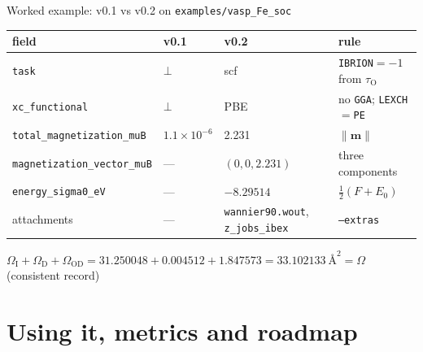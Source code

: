 \documentclass[aspectratio=169,10pt,t]{beamer}
\newcommand{\code}[1]{\texttt{#1}}
\newcommand{\vtag}[1]{\texttt{#1}}
\newcommand{\muted}[1]{\textcolor{muted}{#1}}
\begin{document}
\begin{frame}{Worked example: v0.1 vs v0.2 on \code{examples/vasp\_Fe\_soc}}
\centering\small
\begin{tabular}{@{}llll@{}}
\toprule
field & v0.1 & v0.2 & rule \\\midrule
\code{task} & \textcolor{bad}{\(\bot\)} & \textcolor{good}{scf} & \vtag{IBRION}\(=-1\) from \(\tau_{\mathrm O}\)\\
\code{xc\_functional} & \textcolor{bad}{\(\bot\)} & \textcolor{good}{PBE} & no \vtag{GGA}; \vtag{LEXCH}\(=\)\texttt{PE}\\
\code{total\_magnetization\_muB} & \textcolor{bad}{\(1.1\times10^{-6}\)} & \textcolor{good}{2.231} & \(\lVert\mathbf m\rVert\)\\
\code{magnetization\_vector\_muB} & --- & \((0,0,2.231)\) & three components\\
\code{energy\_sigma0\_eV} & --- & \(-8.29514\) & \(\tfrac12(F+E_0)\)\\
attachments & --- & \code{wannier90.wout}, \code{z\_jobs\_ibex} & \code{--extras}\\
\bottomrule
\end{tabular}
\vspace{4mm}

\begin{keyline}\footnotesize
\(\Omega_{\mathrm I}+\Omega_{\mathrm D}+\Omega_{\mathrm{OD}} = 31.250048+0.004512+1.847573 = 33.102133\ \text{\AA}^2=\Omega\)\quad\muted{(consistent record)}
\end{keyline}
\end{frame}

\section{Using it, metrics and roadmap}
\end{document}
